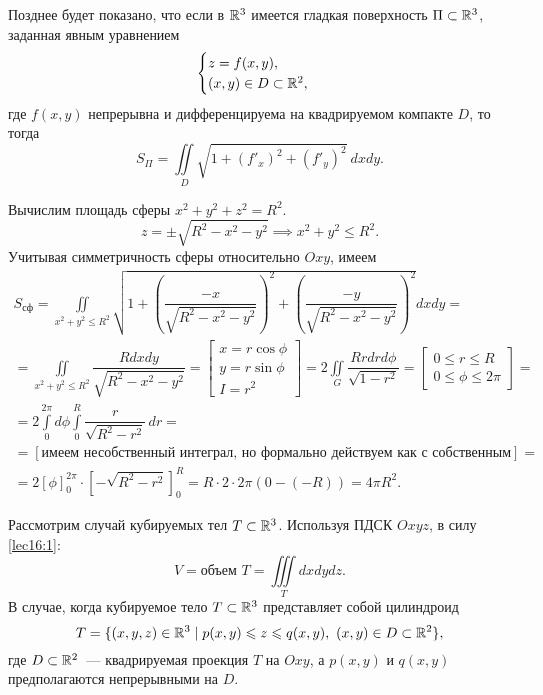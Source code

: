 \documentclass[../../main.tex]{subfiles}
\begin{document}
Позднее будет показано, что если в $\mathbb{R}^{3}$ имеется гладкая поверхность
$\Pi\subset \mathbb{R}^3$, заданная явным уравнением 
\begin{equation*}
\begin{cases}
z = f(x, y),\\
(x, y) \in D \subset \mathbb{R}^{2},
\end{cases}
\end{equation*} 
где $f(x, y)$
непрерывна и дифференцируема на квадрируемом компакте $D$, то тогда
\begin{equation}
\label{lec16:9}
S_\Pi = \iint\limits_D\sqrt{1 + (f'_x)^2 + (f'_y)^2}\:dxdy.
\end{equation}
\begin{example}
	Вычислим площадь сферы $x^2+y^2+z^2=R^2$.
\begin{equation*}
	z=\pm\sqrt{R^2-x^2-y^2}\implies 
	x^2+y^2\leq R^2.
\end{equation*}	
Учитывая симметричность сферы относительно $Oxy$, имеем
\begin{gather*}
S_{\text{сф}}=\iint\limits_{x^2+y^2 \leq R^2}
\sqrt{
1+\left(\dfrac{-x}{\sqrt
	{
		R^2-x^2-y^2
	}}
\right)^2
+
\left(
\dfrac{-y}
{\sqrt{R^2-x^2-y^2}}\right)^2
}dxdy
=\\
=
\iint\limits_{x^2+y^2\leq R^2}
\dfrac{Rdxdy}{\sqrt{R^2-x^2-y^2}}
=
\left[
\begin{gathered}
x=r\cos \phi\\
y=r\sin \phi\\
I=r^2
\end{gathered}
\right]
=
2\iint\limits_{G}
\dfrac{Rrdrd\phi}
{\sqrt{1-r^2}}
=
\left[
\begin{gathered}
0\leq r \leq R\\
0\leq \phi \leq 2 \pi
\end{gathered}
\right]=\\
=
2\int\limits_0^{2\pi}d\phi\int\limits_0^{R}
\dfrac{r}{\sqrt{R^2-r^2}}\,dr=
\\ =[
\text{имеем несобственный интеграл, но формально действуем как с собственным}
]= \\ =
2\left[\phi\right]^{2\pi}_0\cdot
\left[
-\sqrt{R^2-r^2}
\right]^R_0
=
R\cdot2\cdot2\pi(0-(-R))=4\pi R^2.
\end{gather*}
\end{example}
Рассмотрим случай кубируемых тел $T\subset \mathbb{R}^3$. Используя ПДСК $Oxyz$, в 
силу 
\ref{lec16:1}:
\begin{equation}
\label{lec16:10}
V=\text{объем }T=\iiint\limits_T dxdydz.
\end{equation}
В случае, когда кубируемое тело $T\subset \mathbb{R}^3$ представляет собой цилиндроид
\begin{equation*}
T=\{
(x,y,z)\in\mathbb{R}^3 \mid 
p(x,y)\leqslant z \leqslant q(x,y),\ (x,y)\in D\subset \mathbb{R}^2
\},
\end{equation*}
где $D\subset \mathbb{R}^2$~--- квадрируемая проекция $T$ на $Oxy$, а $p(x,y)$ и 
$q(x,y)$ предполагаются непрерывными на $D$.
\end{document}
